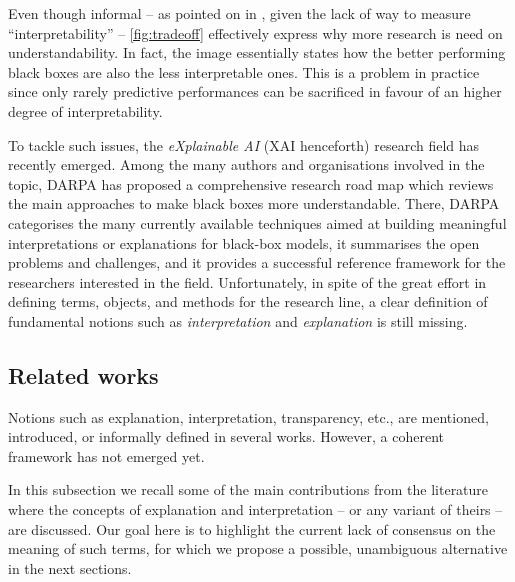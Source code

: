\documentclass[12pt,a4paper,openright,twoside]{book}
\begin{document}
Even though informal -- as pointed on in \cite{Rudin2019}, given the lack of way to measure ``interpretability'' -- \cref{fig:tradeoff} effectively express why more research is need on understandability.
%
In fact, the image essentially states how the better performing black boxes are also the less interpretable ones.
%
This is a problem in practice since only rarely predictive performances can be sacrificed in favour of an higher degree of interpretability.

To tackle such issues, the \emph{eXplainable AI} (XAI henceforth) research field has recently emerged.
%
Among the many authors and organisations involved in the topic, DARPA has proposed a comprehensive research road map \cite{darpa2016-xai} which reviews the main approaches to make black boxes more understandable.
%
There, DARPA categorises the many currently available techniques aimed at building meaningful interpretations or explanations for black-box models, it summarises the open problems and challenges, and it provides a successful reference framework for the researchers interested in the field.
%
Unfortunately, in spite of the great effort in defining terms, objects, and methods for the research line, a clear definition of fundamental notions such as \emph{interpretation} and \emph{explanation} is still missing.

\subsection{Related works}\label{ssec:related}

Notions such as explanation, interpretation, transparency, etc., are mentioned, introduced, or informally defined in several works.
%
However, a coherent framework has not emerged yet.

In this subsection we recall some of the main contributions from the literature where the concepts of explanation and interpretation -- or any variant of theirs -- are discussed.
%
Our goal here is to highlight the current lack of consensus on the meaning of such terms, for which we propose a possible, unambiguous alternative in the next sections.
\end{document}
